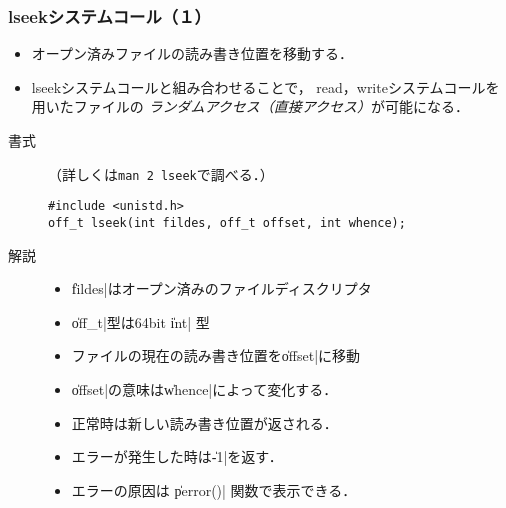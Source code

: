 \documentclass{beamer}                 %
\begin{document}
\begin{frame}[fragile]
  \frametitle{lseekシステムコール（１）}
\begin{itemize}
\item オープン済みファイルの読み書き位置を移動する．
\item lseekシステムコールと組み合わせることで，
read，writeシステムコールを用いたファイルの
\emph{ランダムアクセス（直接アクセス）}が可能になる．
\end{itemize}

\begin{description}
\item[書式]（詳しくは\texttt{man 2 lseek}で調べる．）
\begin{lstlisting}[numbers=none]
#include <unistd.h>
off_t lseek(int fildes, off_t offset, int whence);
\end{lstlisting}

\item[解説]
\begin{itemize}
\item \|fildes|はオープン済みのファイルディスクリプタ
\item \|off_t|型は64bit \|int| 型
\item ファイルの現在の読み書き位置を\|offset|に移動
\item \|offset|の意味は\|whence|によって変化する．
\item 正常時は新しい読み書き位置が返される．
\item エラーが発生した時は\|-1|を返す．
\item エラーの原因は \|perror()| 関数で表示できる．
\end{itemize}
\end{description}
\end{frame}
\end{document}
